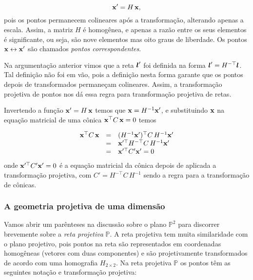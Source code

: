 \begin{equation*}
\mathbf{x}'=H\,\mathbf{x},
\end{equation*}
pois os pontos permanecem colineares após a transformação, alterando apenas a escala. Assim, a matriz $H$ é homogênea, e apenas a razão entre os seus elementos é significante, ou seja, são nove elementos mas oito graus de liberdade. Os pontos $\mathbf{x}\leftrightarrow\mathbf{x}'$ são chamados {\it pontos correspondentes}.\\


Na argumentação anterior vimos que a reta $\boldsymbol{l}'$ foi definida na forma $\boldsymbol{l}'=H^{-\top}\boldsymbol{l}$. Tal definição não foi em vão, pois a definição nesta forma garante que os pontos depois de transformados permaneçam colineares. Assim, a transformação projetiva de pontos nos dá essa regra para transformação projetiva de retas.\\


Invertendo a função $\mathbf{x}'=H\,\mathbf{x}$ temos que $\mathbf{x}=H^{-1}\mathbf{x}'$, e substituindo $\mathbf{x}$ na equação matricial de uma cônica $\mathbf{x}^\top C\,\mathbf{x}=0$ temos

\begin{equation*}
\begin{array}{rcl}
\mathbf{x}^\top C\,\mathbf{x}&=&(H^{-1}\mathbf{x}')^\top C\,H^{-1}\mathbf{x}'\\
&=&\mathbf{x}'^\top H^{-\top}C\,H^{-1}\mathbf{x}'\\
&=&\mathbf{x}'^\top C'\mathbf{x}'=0
\end{array}
\end{equation*}
onde $\mathbf{x}'^\top C'\mathbf{x}'=0$ é a equação matricial da cônica depois de aplicada a transformação projetiva, com $C'=H^{-\top}C\,H^{-1}$ sendo a regra para a transformação de cônicas.


\subsubsection{A geometria projetiva de uma dimensão}\label{sec.geometria-1D}
Vamos abrir um parênteses na discussão sobre o plano ${\mathbb{P}^2}$ para discorrer brevemente sobre a {\it reta projetiva} ${\mathbb{P}}$. A reta projetiva tem muita similaridade com o plano projetivo, pois pontos na reta são representados em coordenadas homogêneas (vetores com duas componentes) e são projetivamente transformados de acordo com uma homografia $H_{2\times2}$. Na reta projetiva ${\mathbb{P}}$ os pontos têm as seguintes notação e transformação projetiva: 

